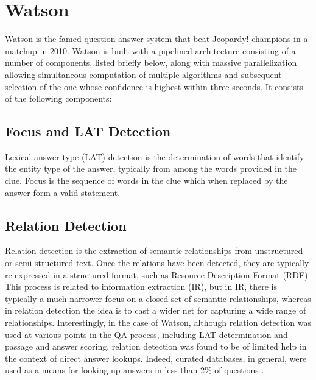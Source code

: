 \section{Watson}

Watson \cite{ferrucci2010building} is the famed question answer system that beat Jeopardy! champions in a matchup in 2010.  Watson is built with a pipelined architecture consisting of a number of components, listed briefly below, along with massive parallelization allowing simultaneous computation of multiple algorithms and subsequent selection of the one whose confidence is highest within three seconds.  It consists of the following components:

\subsection{Focus and LAT Detection}

Lexical answer type (LAT) detection is the determination of words that identify the entity type of the answer, typically from among the words provided in the clue.  Focus is the sequence of words in the clue which when replaced by the answer form a valid statement.

\subsection{Relation Detection}

Relation detection is the extraction of semantic relationships from unstructured or semi-structured text.   Once the relations have been detected, they are typically re-expressed in a structured format, such as Resource Description Format (RDF).  This process is related to information extraction (IR), but in IR, there is typically a much narrower focus on a closed set of semantic relationships, whereas in relation detection the idea is to cast a wider net for capturing a wide range of relationships.  Interestingly, in the case of Watson, although relation detection was used at various points in the QA process, including LAT determination and passage and answer scoring, relation detection was found to be of limited help in the context of direct answer lookups.  Indeed, curated databases, in general, were used as a means for looking up answers in less than 2\% of questions \cite{ferrucci2010building}.

